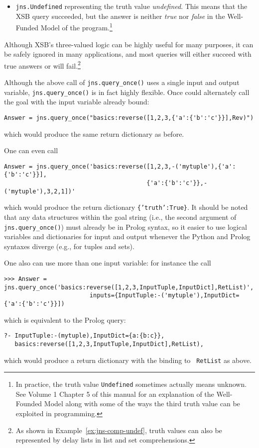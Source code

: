 \begin{example}
\begin{itemize}
  means the XSB query failed and has no answers in the Well-Founded
  Model of the program.  In such a case, the return dictionary has the form
\begin{verbatim}
{truth:False}
\end{verbatim}
\item {\tt jns.Undefined} representing the truth value {\em
  undefined}. This means that the XSB query succeeded, but the answer
  is neither {\em true} nor {\em false} in the Well-Funded Model of
  the program.\footnote{In practice, the truth value {\tt Undefined}
  sometimes actually means unknown. See Volume 1 Chapter 5 of this
  manual for an explanation of the Well-Founded Model along with some
  of the ways the third truth value can be exploited in programming.}
\end{itemize}
\noindent
Although XSB's three-valued logic can be highly useful for many
purposes, it can be safely ignored in many applications, and most
queries will either succeed with true answers or will
fail.\footnote{As shown in Example~\ref{ex:jns-comp-undef}, truth
  values can also be represented by delay lists in list and set
  comprehensions.}


Although the above call of {\tt jns.query\_once()} uses a single input
and output variable, {\tt jns.query\_once()} is in fact highly
flexible.  Once could alternately call the goal with the input
variable already bound:
\begin{verbatim}
Answer = jns.query_once("basics:reverse([1,2,3,{'a':{'b':'c'}}],Rev)")
\end{verbatim}
which would produce the same return dictionary as before.

One can even call 
\begin{verbatim}
Answer = jns.query_once('basics:reverse([1,2,3,-('mytuple'),{'a':{'b':'c'}}],
                                        {'a':{'b':'c'}},-('mytuple'),3,2,1])'
\end{verbatim}
which would produce the return dictionary {\tt \{'truth':True\}}.  It
should be noted that any data structures within the goal string (i.e.,
the second argument of {\tt jns.query\_once()}) must already be in
  Prolog syntax, so it easier to use logical variables and
  dictionaries for input and output whenever the Python and Prolog
  syntaxes diverge (e.g., for tuples and sets).

One also can use more than one input variable: for instance the call
\begin{verbatim}
>>> Answer = jns.query_once('basics:reverse([1,2,3,InputTuple,InputDict],RetList)',
                        inputs={InputTuple:-('mytuple'),InputDict={'a':{'b':'c'}}])
\end{verbatim}
which is equivalent to the Prolog query:
\begin{verbatim}
?- InputTuple:-(mytuple),InputDict={a:{b:c}},
   basics:reverse([1,2,3,InputTuple,InputDict],RetList),
\end{verbatim}
which would produce a return dictionary with the binding to {\tt
  RetList} as above.
\end{example}

